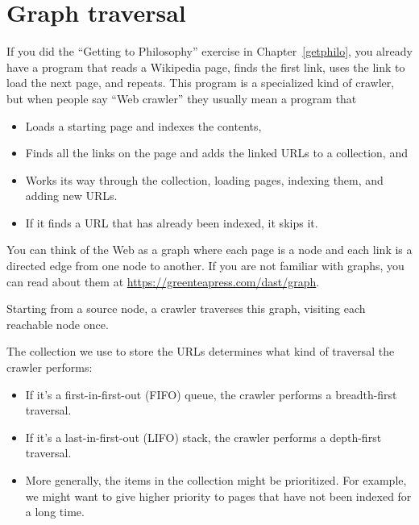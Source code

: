\documentclass[12pt]{book}
\theoremstyle{exercise}
\begin{document}
\section{Graph traversal}
\label{graph-traversal}

If you did the ``Getting to Philosophy'' exercise in
Chapter~\ref{getphilo}, you already have a program that reads a Wikipedia
page, finds the first link, uses the link to load the next page, and
repeats. This program is a specialized kind of crawler, but when
people say ``Web crawler'' they usually mean a program that

\begin{itemize}

\item
  Loads a starting page and indexes the contents,

\item
  Finds all the links on the page and adds the linked URLs to a collection,
  and

\item
  Works its way through the collection, loading pages, indexing them, and
  adding new URLs.

\item
  If it finds a URL that has already been indexed, it skips
  it.

\end{itemize}

You can think of the Web as a graph
where each page is a node and each link is a directed edge from one node
to another. If you are not familiar with graphs, you can read about
them at \url{https://greenteapress.com/dast/graph}.


Starting from a source node, a crawler traverses this graph,
visiting each reachable node once.


The collection we use to store the URLs determines what kind of
traversal the crawler performs:

\begin{itemize}

\item
  If it's a first-in-first-out (FIFO) queue, the crawler performs a
  breadth-first traversal.

\item
  If it's a last-in-first-out (LIFO) stack, the crawler performs a
  depth-first traversal.

\item
  More generally, the items in the collection might be prioritized. For
  example, we might want to give higher priority to pages that have not
  been indexed for a long time.

\end{itemize}
\end{document}
